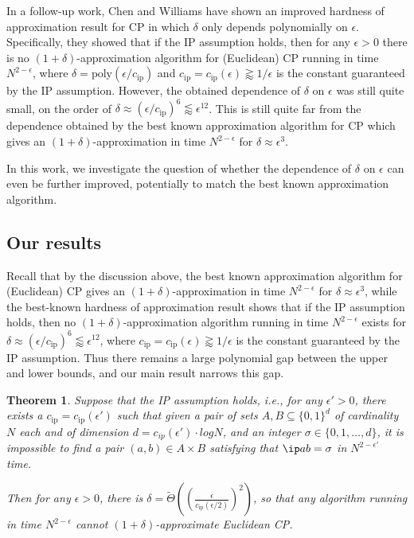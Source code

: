 \documentclass[11pt]{article}
\theoremstyle{plain}
\newtheorem{thm}{Theorem}[section]
\theoremstyle{remark}
\newcommand{\iP}{\mathrm{ip}}
\newcommand{\poly}{\mathrm{poly}}
\begin{document}
In a follow-up work, Chen and Williams \cite{CW19} have shown an improved hardness of approximation result for CP in which $\delta$ only depends polynomially on $\epsilon$. Specifically, they showed that if the IP assumption holds, then for any $\epsilon>0$ there is no 
$(1+\delta)$-approximation algorithm for (Euclidean) CP running in time $N^{2-\epsilon}$, where $\delta = \poly(\epsilon/c_{\iP})$ and $c_{\iP} = c_{\iP}(\epsilon) \gtrapprox 1/\epsilon$  is the constant guaranteed by the IP assumption.
However, the obtained dependence of $\delta$ on $\epsilon$ was still quite small, on the order of $\delta \approx (\epsilon/c_{\iP})^6 \lessapprox \epsilon^{12}$. This is still quite far from the dependence obtained by the best known approximation algorithm for CP which gives an $(1+\delta)$-approximation in time $N^{2-\epsilon}$ for $\delta \approx \epsilon^3$.

In this work, we investigate the question of whether the dependence of $\delta$ on $\epsilon$ can even be further improved, potentially to match the best known approximation algorithm.

\subsection{Our results}

Recall that by the discussion above, the best known approximation algorithm for (Euclidean) CP gives an $(1+\delta)$-approximation in time $N^{2-\epsilon}$ for $\delta \approx \epsilon^3$, while the best-known hardness of approximation result shows that if the IP assumption holds, then no $(1+\delta)$-approximation algorithm running in time $N^{2-\epsilon}$ exists for
$\delta \approx  (\epsilon/c_{\iP})^6 \lessapprox \epsilon^{12}$, where $c_{\iP} = c_{\iP}(\epsilon) \gtrapprox 1/\epsilon$  is the constant guaranteed by the IP assumption.
Thus there remains a large polynomial gap between the upper and lower bounds, and our main result narrows this gap.


\begin{thm}\label{thm:main}
Suppose that the IP assumption holds, i.e.,  for any $\epsilon'>0$, there exists a $c_{\iP}= c_{\iP}(\epsilon')$ such that given a pair of sets $A,B\subseteq\{0,1\}^{d}$ of cardinality $N$ each and of dimension $d = c_{ip}(\epsilon') \cdot logN$, and an integer $\sigma \in \{0,1,\ldots,d\}$,  it is impossible to find a pair $(a,b)\in A\times B$
satisfying that $\ip a b=\sigma$ in $N^{2-\epsilon'}$ time. 

Then for any $\epsilon>0$, there is  $\delta = \tilde \Theta(  ( \frac \epsilon {c_{\iP}(\epsilon/2)})^2)$,  so that any algorithm running in time 
$N^{2-\epsilon}$ cannot 
$(1+\delta)$-approximate Euclidean CP.
\end{thm}
\end{document}
